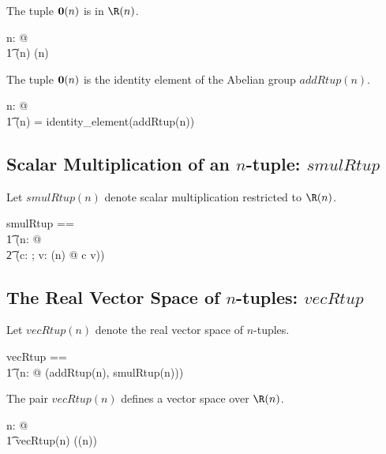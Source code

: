 \documentclass{amsart}
\begin{document}
\begin{remark}
The tuple $\operatorname{\mathbf{0}}(n)$ is in $\Rtup(n)$.

\begin{zed}
\forall n: \nat @ \\
\t1	\zeroRtup(n) \in \Rtup(n)
\end{zed}

\end{remark}

\begin{remark}
The tuple $\operatorname{\mathbf{0}}(n)$ is the identity element of the Abelian group $addRtup(n)$.

\begin{zed}
\forall n: \nat @ \\
\t1	\zeroRtup(n) = identity\_element(addRtup(n))
\end{zed}

\end{remark}

\subsection{Scalar Multiplication of an $n$-tuple: $smulRtup$}

Let $smulRtup(n)$ denote scalar multiplication restricted to $\Rtup(n)$.

\begin{zed}
smulRtup == \\
\t1	(\lambda n: \nat @ \\
\t2		(\lambda c: \R; v: \Rtup(n) @ c \smulRinf v))
\end{zed}

\subsection{The Real Vector Space of $n$-tuples: $vecRtup$}

Let $vecRtup(n)$ denote the real vector space of $n$-tuples.

\begin{zed}
vecRtup == \\
\t1	(\lambda n: \nat @ (addRtup(n), smulRtup(n)))
\end{zed}

\begin{remark}
The pair $vecRtup(n)$ defines a vector space over $\Rtup(n)$.

\begin{zed}
\forall n: \nat @ \\
\t1	vecRtup(n) \in \vecR(\Rtup(n))
\end{zed}

\end{remark}
\end{document}
